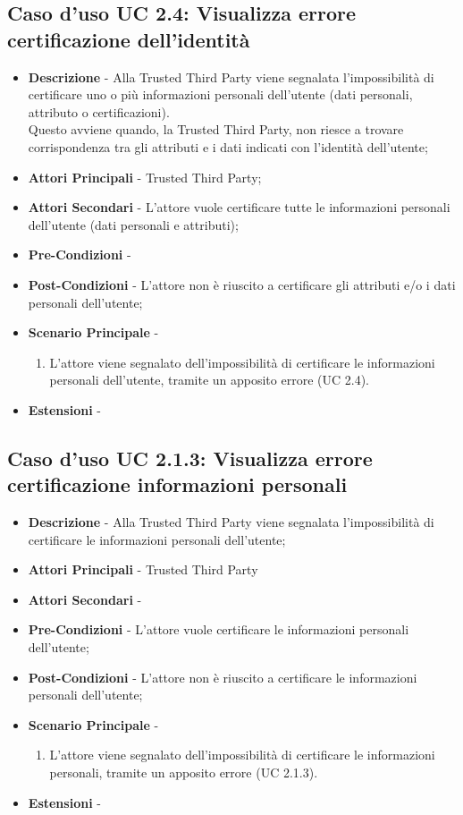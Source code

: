 \subsection{Caso d'uso UC 2.4: Visualizza errore certificazione dell'identità}
\begin{itemize}
	\item \textbf{Descrizione} - Alla Trusted Third Party viene segnalata l'impossibilità di certificare uno o più informazioni personali dell'utente (dati personali, attributo o certificazioni).\\
	Questo avviene quando, la Trusted Third Party, non riesce a trovare corrispondenza tra gli attributi e i dati indicati con l'identità dell'utente;
	\item \textbf{Attori Principali} - Trusted Third Party;
	\item \textbf{Attori Secondari} - L'attore vuole certificare tutte le informazioni personali dell'utente (dati personali e attributi);
	\item \textbf{Pre-Condizioni} -
	\item \textbf{Post-Condizioni} - L'attore non è riuscito a certificare gli attributi e/o i dati personali dell'utente;
	\item \textbf{Scenario Principale} -
	\begin{enumerate}
		\item L'attore viene segnalato dell'impossibilità di certificare le informazioni personali dell'utente, tramite un apposito errore (UC 2.4).
	\end{enumerate}
	\item \textbf{Estensioni} -
\end{itemize}
\subsection{Caso d'uso UC 2.1.3: Visualizza errore certificazione informazioni personali}
\begin{itemize}
	\item \textbf{Descrizione} - Alla Trusted Third Party viene segnalata l'impossibilità di certificare le informazioni personali dell'utente;
	\item \textbf{Attori Principali} - Trusted Third Party
	\item \textbf{Attori Secondari} -
	\item \textbf{Pre-Condizioni} - L'attore vuole certificare le informazioni personali dell'utente;
	\item \textbf{Post-Condizioni} - L'attore non è riuscito a certificare le informazioni personali dell'utente;
	\item \textbf{Scenario Principale} -
	\begin{enumerate}
		\item L'attore viene segnalato dell'impossibilità di certificare le informazioni personali, tramite un apposito errore (UC 2.1.3).
	\end{enumerate}
	\item \textbf{Estensioni} -
\end{itemize}
